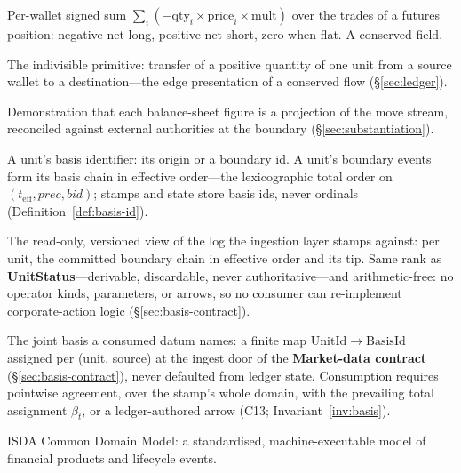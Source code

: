 \documentclass[11pt,a4paper]{article}
\begin{document}
\begin{description}[style=nextline]

\item[Accumulated cost] Per-wallet signed sum $\sum_i(-\mathrm{qty}_i\times\mathrm{price}_i\times\mathrm{mult})$ over the trades of a futures position: negative net-long, positive net-short, zero when flat. A conserved field.

\item[Atomic move] The indivisible primitive: transfer of a positive quantity of one unit from a source wallet to a destination---the edge presentation of a conserved flow (\S\ref{sec:ledger}).

\item[Balance-sheet substantiation] Demonstration that each balance-sheet figure is a projection of the move stream, reconciled against external authorities at the boundary (\S\ref{sec:substantiation}).

\item[Basis id (\texttt{BasisId})] A unit's basis identifier: its origin or a boundary id. A unit's boundary events form its basis chain in effective order---the lexicographic total order on $(t_{\mathrm{eff}},\mathit{prec},\mathit{bid})$; stamps and state store basis ids, never ordinals (Definition~\ref{def:basis-id}).

\item[Basis projection (\texttt{BasisView})] The read-only, versioned view of the log the ingestion layer stamps against: per unit, the committed boundary chain in effective order and its tip. Same rank as \textbf{UnitStatus}---derivable, discardable, never authoritative---and arithmetic-free: no operator kinds, parameters, or arrows, so no consumer can re-implement corporate-action logic (\S\ref{sec:basis-contract}).

\item[Basis stamp] The joint basis a consumed datum names: a finite map $\mathrm{UnitId}\to\mathrm{BasisId}$ assigned per (unit, source) at the ingest door of the \textbf{Market-data contract} (\S\ref{sec:basis-contract}), never defaulted from ledger state. Consumption requires pointwise agreement, over the stamp's whole domain, with the prevailing total assignment $\beta_t$, or a ledger-authored arrow (C13; Invariant~\ref{inv:basis}).

\item[CDM] ISDA Common Domain Model: a standardised, machine-executable model of financial products and lifecycle events.


\end{description}
\end{document}

